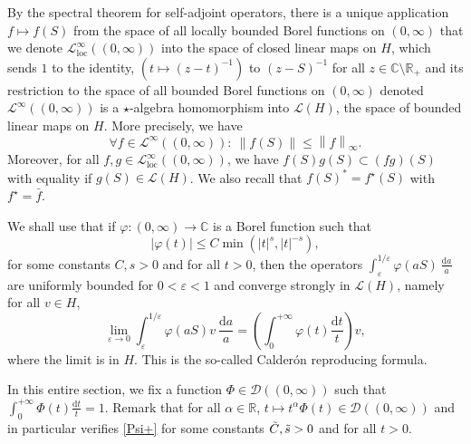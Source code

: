 \documentclass[11pt, letterpaper]{amsart}
\theoremstyle{definition}
\theoremstyle{remark}
\numberwithin{equation}{section}
\begin{document}
By the spectral theorem for self-adjoint operators, there is a unique application $f\mapsto f(S)$ from the space of all locally bounded Borel functions on $(0,\infty)$ that we denote $\mathcal{L}^\infty_{\mathrm{loc}}((0,\infty))$ into the space of closed linear maps on $H$, which sends $1$ to the identity, $(t\mapsto(z-t)^{-1})$ to $(z-S)^{-1}$ for all $z \in \mathbb{C}\setminus \mathbb{R}_+$ and its restriction to the space of all bounded Borel functions on $(0,\infty)$ denoted $\mathcal{L}^\infty((0,\infty))$ is a $\star$-algebra homomorphism  into $\mathcal{L}(H)$, the space of bounded linear maps on $H$. More precisely, we have
$$\forall f \in \mathcal{L}^\infty((0,\infty)): \ \left\|f(S) \right\|\leq \left\|f \right\|_{\infty}.$$
Moreover, for all $f,g \in \mathcal{L}^\infty_{\mathrm{loc}}((0,\infty))$, we have $f(S)g(S)\subset (fg)(S)$ with equality if $g(S) \in \mathcal{L}(H)$. We also recall that $f(S)^*=f^\star (S)$ with $f^\star= \bar f$.



We shall use that if $\varphi :  (0,\infty) \rightarrow \mathbb{C}$ is a Borel function such that 
\begin{equation}\label{Psi+}
    \left| \varphi(t) \right| \leq C \min(\left|t \right|^s,\left|t \right|^{-s}),
\end{equation}
for some constants $C,s >0$ and for all $t>0$,
then the operators $\int_{\varepsilon}^{{1}/{\varepsilon}} \varphi(aS) \ \frac{\mathrm{d}a}{a}$ are uniformly bounded for $0<\varepsilon<1$ and converge strongly in $\mathcal{L}(H)$, namely for all $v \in H$,
\begin{equation}\label{eq:Calderon}
    \lim_{\varepsilon \to 0} \int_{\varepsilon}^{{1}/{\varepsilon}} \varphi(aS)v \ \frac{\mathrm{d}a}{a} = \left ( \int_{0}^{+\infty} \varphi(t) \frac{\mathrm d t}{t} \right ) v,
\end{equation}
where the limit is in $H$. This is the so-called Calder\'on reproducing formula.

In this entire section, we fix a function $\Phi \in \mathcal{D}((0,\infty))$ such that $\int_{0}^{+\infty} \Phi (t) \frac{\mathrm{d} t}{t}=1$. Remark that for all $\alpha \in \mathbb{R}$, $t\mapsto t^\alpha  \Phi(t) \in \mathcal{D} ((0,\infty) )$ and in particular verifies \eqref{Psi+} for some constants $\Tilde{C}, \Tilde{s}>0$ and for all $t>0$.
\end{document}
